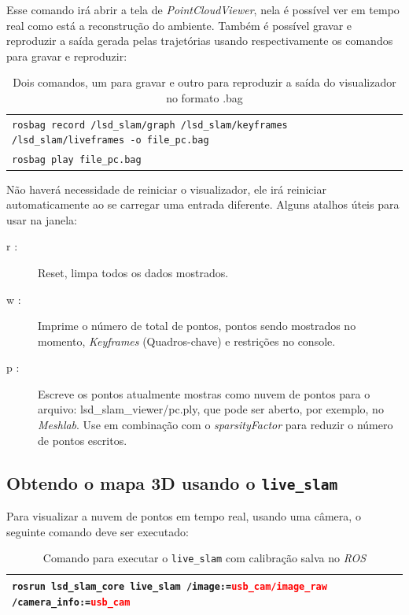 Esse comando irá abrir a tela de \textit{PointCloudViewer}, nela é possível ver em tempo real como está a reconstrução do ambiente. Também é possível gravar e reproduzir a saída gerada pelas trajetórias usando respectivamente os comandos para gravar e reproduzir:

\begin{table}[H]\label{tb:13}
\begin{tabular}{| p{\textwidth}|}
\hline
\texttt{rosbag record /lsd\_slam/graph /lsd\_slam/keyframes /lsd\_slam/liveframes -o file\_pc.bag}\\
\texttt{rosbag play file\_pc.bag}\\
\hline
\end{tabular}
\caption{Dois comandos, um para gravar e outro para reproduzir a saída do visualizador no formato .bag}
\end{table}

Não haverá necessidade de reiniciar o visualizador, ele irá reiniciar automaticamente ao se carregar uma entrada diferente. Alguns atalhos úteis para usar na janela:

\begin{description}
	\item[r :]{Reset, limpa todos os dados mostrados.}
	\item[w :]{Imprime o número de total de pontos, pontos sendo mostrados no momento, \textit{Keyframes} (Quadros-chave) e restrições no console.}
	\item[p :]{Escreve os pontos atualmente mostras como nuvem de pontos para o arquivo: lsd\_slam\_viewer/pc.ply, que pode ser aberto, por exemplo, no \textit{Meshlab}. Use  em combinação com o \textit{sparsityFactor}  para reduzir o número de pontos escritos.}
\end{description}	

\subsection{Obtendo o mapa 3D usando o \texttt{live\_slam}}

Para visualizar a nuvem de pontos em tempo real, usando uma câmera, o seguinte comando deve ser executado:

\begin{table}[H]\label{tb:14}
\begin{tabular}{| p{\textwidth}|}
\hline
\texttt{rosrun lsd\_slam\_core live\_slam /image:=\textcolor{red}{usb\_cam/image\_raw} /camera\_info:=\textcolor{red}{usb\_cam}}\\
\hline
\end{tabular}
\caption{Comando para executar o \texttt{live\_slam} com calibração salva no \textit{ROS}}
\end{table}

